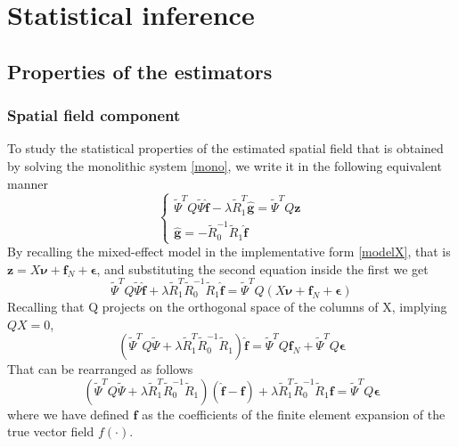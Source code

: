 \chapter{Statistical inference}
\section{Properties of the estimators}
\subsection{Spatial field component}
\nocite{*}
To study the statistical properties of the estimated spatial field that is obtained by solving the monolithic system \ref{mono}, we write it in the following equivalent manner
\begin{equation}
    \begin{cases}
        \tilde{\Psi}^TQ\tilde{\Psi} \hat{\bm{f}} -\lambda \tilde{R}_1^T \hat{\bm{g}} = \tilde{\Psi}^T Q\mathbf{z}\\
        \hat{\bm{g}} = - \tilde{R}_0^{-1} \tilde{R}_1 \hat{\bm{f}}
    \end{cases}
\end{equation}
By recalling the mixed-effect model in the implementative form \ref{modelX}, that is $\bm{z} = X \bm{\nu} + \bm{f}_N + \bm{\epsilon}$, and substituting the second equation inside the first we get
\begin{equation}
    \tilde{\Psi}^TQ\tilde{\Psi} \hat{\bm{f}} +\lambda \tilde{R}_1^T \tilde{R}_0^{-1} \tilde{R}_1 \hat{\bm{f}} = \tilde{\Psi}^T Q \left( X \bm{\nu} + \bm{f}_N + \bm{\epsilon} \right)
\end{equation}
Recalling that Q projects on the orthogonal space of the columns of X, implying $Q X = 0$,
\begin{equation}
    \left(\tilde{\Psi}^TQ\tilde{\Psi} +\lambda \tilde{R}_1^T \tilde{R}_0^{-1} \tilde{R}_1 \right) \hat{\bm{f}} = \tilde{\Psi}^T Q \bm{f}_N + \tilde{\Psi}^T Q \bm{\epsilon}
\end{equation}
That can be rearranged as follows
\begin{equation}
    \left(\tilde{\Psi}^TQ\tilde{\Psi} +\lambda \tilde{R}_1^T \tilde{R}_0^{-1} \tilde{R}_1 \right) 
    \left(\hat{\bm{f}} - \bm{f}\right)
    + \lambda \tilde{R}_1^T \tilde{R}_0^{-1} \tilde{R}_1 \bm{f} = \tilde{\Psi}^T Q \bm{\epsilon}
\end{equation}
where we have defined $\bm{f}$ as the coefficients of the finite element expansion of the true vector field $f(\cdot)$.
